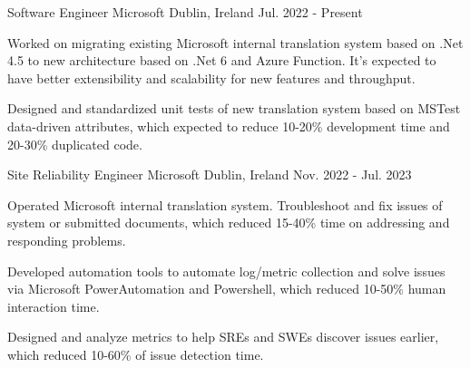 

\begin{cventries}

    \cventry
        {Software Engineer}
        {Microsoft}
        {Dublin, Ireland}
        {Jul. 2022 - Present}
        {
            \begin{cvitems}
                \item
                {
                    Worked on migrating existing Microsoft internal translation system based on .Net 4.5 to new architecture based on .Net 6 and Azure Function. It's expected to have better extensibility and scalability for new features and throughput.
                }
                \item
                {
                    Designed and standardized unit tests of new translation system based on MSTest data-driven attributes, which expected to reduce 10-20\% development time and 20-30\% duplicated code.
                }
            \end{cvitems}
        }

    \cventry
        {Site Reliability Engineer}
        {Microsoft}
        {Dublin, Ireland}
        {Nov. 2022 - Jul. 2023}
        {
            \begin{cvitems}
                \item
                {
                    Operated Microsoft internal translation system. Troubleshoot and fix issues of system or submitted documents, which reduced 15-40\% time on addressing and responding problems.
                }
                \item
                {
                    Developed automation tools to automate log/metric collection and solve issues via Microsoft PowerAutomation and Powershell, which reduced 10-50\% human interaction time.
                }
                \item
                {
                    Designed and analyze metrics to help SREs and SWEs discover issues earlier, which reduced 10-60\% of issue detection time.
                }
            \end{cvitems}
        }


\end{cventries}
